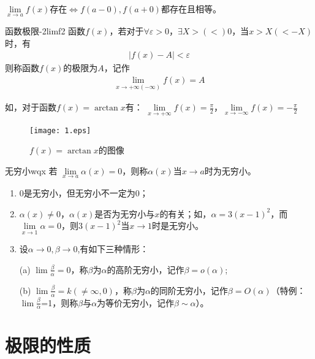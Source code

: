 \documentclass[cn,12pt,chinese]{elegantbook}
\begin{document}
\FiveStar $\lim\limits_{x \to a} f(x)$存在$\iff f(a-0),f(a+0)$都存在且相等。

\begin{definition}{函数极限-2}{limf2}
函数$f(x)$，若对于$ \forall\varepsilon>0 $，$ \exists X>(<)0 $，当$ x>X(<-X) $时，有
\begin{align}
    \vert{f(x)-A}\vert<\varepsilon
\end{align}
则称函数$f(x)$的极限为$A$，记作
\begin{align}
    \lim_{x\to +\infty(-\infty)} f(x)=A 
\end{align}
\end{definition}

如，对于函数$f(x)=\arctan{x}$有：
 $\lim\limits_{x\to +\infty} f(x)=\displaystyle\frac{\pi}{2}$，$\lim\limits_{x\to -\infty} f(x)=-\displaystyle \frac{\pi}{2}$

 \begin{figure}[htbp]
    \centering
    \texttt{[image: 1.eps]}
    \caption{$f(x)=\arctan{x}$的图像}
  \end{figure}
  
\begin{definition}{无穷小}{wqx}
若 $ \lim\limits_{x \to a} \alpha(x)=0$，则称$ \alpha(x)$当$x \to a$时为无穷小。
\end{definition}

\begin{note}
\begin{enumerate}
  \item 0是无穷小，但无穷小不一定为0；
  \item $\alpha(x)\neq 0$，$\alpha(x)$是否为无穷小与$ x $的有关；如，$\alpha=3(x-1)^2$，而$\lim\limits_{x \to 1}\alpha=0 $，则$3(x-1)^2$当$x \to 1$时是无穷小。
  \item 设$\alpha \to 0,\beta \to 0$,有如下三种情形：
  
  (a) $\lim \displaystyle\frac{\beta}{\alpha}=0$，称$ \beta $为$ \alpha $的高阶无穷小，记作$\beta=o(\alpha)$;
  
  (b) $\lim \displaystyle\frac{\beta}{\alpha}=k(\neq \infty,0)$，称$ \beta $为$ \alpha $的同阶无穷小，记作$\beta=O(\alpha)$（特例：$\lim \displaystyle\frac{\beta}{\alpha}$=1，则称$ \beta $与$ \alpha $为等价无穷小，记作$\beta \sim \alpha$）。
\end{enumerate}
\end{note}


\section{极限的性质}
\end{document}
